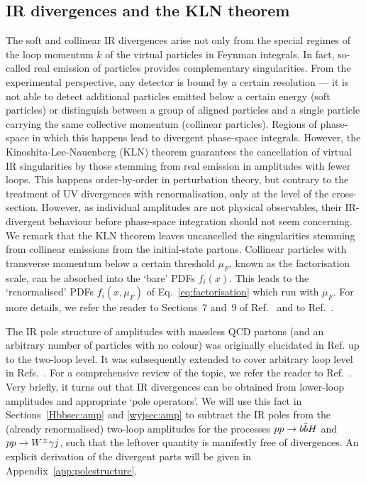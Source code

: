 \documentclass[main.tex]{subfiles}
\begin{document}
\subsection{IR divergences and the KLN theorem} \label{sec:IRdivergencesandKLN}
The soft and collinear IR divergences arise not only from the special regimes of the loop momentum $k$ of the virtual particles in Feynman integrals. In fact, so-called real emission of particles provides complementary singularities. From the experimental perspective, any detector is bound by a certain resolution --- it is not able to detect additional particles emitted below a certain energy (soft particles) or distinguish between a group of aligned particles and a single particle carrying the same collective momentum (collinear particles). Regions of phase-space in which this happens lead to divergent phase-space integrals. However, the Kinoshita-Lee-Nauenberg (KLN) theorem guarantees the cancellation of virtual IR singularities by those stemming from real emission in amplitudes with fewer loops\cite{10.1063/1.1724268, PhysRev.133.B1549}. This happens order-by-order in perturbation theory, but contrary to the treatment of UV divergences with renormalisation, only at the level of the cross-section. However, as individual amplitudes are not physical observables, their IR-divergent behaviour before phase-space integration should not seem concerning. We remark that the KLN theorem leaves uncancelled the singularities stemming from collinear emissions from the initial-state partons. Collinear particles with transverse momentum below a certain threshold $\mu_F$, known as the factorisation scale, can be absorbed into the `bare' PDFs $f_i(x)$. This leads to the `renormalised' PDFs $f_i(x, \mu_F)$ of Eq.~\ref{eq:factorisation} which run with $\mu_F$. For more details, we refer the reader to Sections~7 and~9 of Ref.~\cite{ellis2003qcd} and to Ref.~\cite{Collins:1989gx}.

The IR pole structure of amplitudes with massless QCD partons (and an arbitrary number of particles with no colour) was originally elucidated in Ref.\cite{Catani:1998bh} up to the two-loop level. It was subsequently extended to cover arbitrary loop level in Refs.~\cite{Becher:2009cu, Becher:2009qa, Gardi:2009qi}. For a comprehensive review of the topic, we refer the reader to Ref.~\cite{Agarwal:2021ais}. Very briefly, it turns out that IR divergences can be obtained from lower-loop amplitudes and appropriate `pole operators'. We will use this fact in Sections~\ref{Hbbsec:amp} and \ref{wyjsec:amp} to subtract the IR poles from the (already renormalised) two-loop amplitudes for the processes $pp \rightarrow b\bar{b}H$ and $pp \rightarrow W^\pm \gamma j$, such that the leftover quantity is manifestly free of divergences. An explicit derivation of the divergent parts will be given in Appendix~\ref{app:polestructure}.
\end{document}

